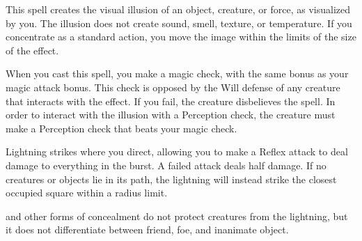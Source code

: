 \spelldur{\durshort}
\begin{spelleffect}
    This spell creates the visual illusion of an object, creature, or force, as visualized by you. The illusion does not create sound, smell, texture, or temperature. If you concentrate as a standard action, you move the image within the limits of the size of the effect.
\end{spelleffect}
\begin{spellnotes}
    When you cast this spell, you make a magic check, with the same bonus as your magic attack bonus. This check is opposed by the Will defense of any creature that interacts with the effect. If you fail, the creature disbelieves the spell. In order to interact with the illusion with a Perception check, the creature must make a Perception check that beats your magic check.
\end{spellnotes}

\begin{spelleffect}
    Lightning strikes where you direct, allowing you to make a Reflex attack to deal damage to everything in the burst. A failed attack deals half damage. If no creatures or objects lie in its path, the lightning will instead strike the closest occupied square within a \areamed radius limit.
\end{spelleffect}
\begin{spellnotes}
     and other forms of concealment do not protect creatures from the lightning, but it does not differentiate between friend, foe, and inanimate object.
\end{spellnotes}

